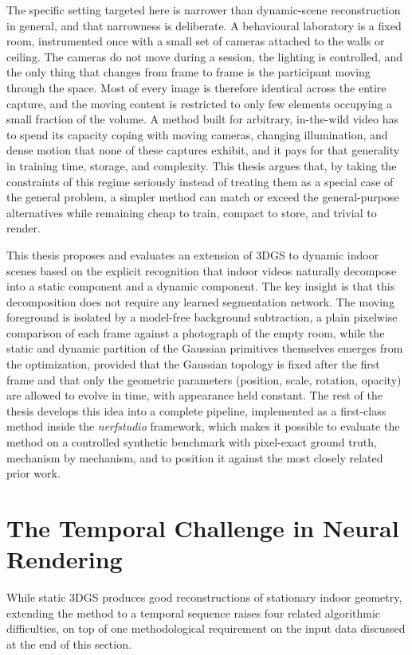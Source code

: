 The specific setting targeted here is narrower than dynamic-scene reconstruction
in general, and that narrowness is deliberate. A behavioural laboratory is a
fixed room, instrumented once with a small set of cameras attached to the walls
or ceiling. The cameras do not move during a session, the lighting is
controlled, and the only thing that changes from frame to frame is the
participant moving through the space. Most of every image is therefore identical
across the entire capture, and the moving content is restricted to only few
elements occupying a small fraction of the volume. A method built for arbitrary,
in-the-wild video has to spend its capacity coping with moving cameras, changing
illumination, and dense motion that none of these captures exhibit, and it pays
for that generality in training time, storage, and complexity. This thesis
argues that, by taking the constraints of this regime seriously instead of
treating them as a special case of the general problem, a simpler method can
match or exceed the general-purpose alternatives while remaining cheap to train,
compact to store, and trivial to render.

This thesis proposes and evaluates an extension of 3DGS to dynamic indoor scenes
based on the explicit recognition that indoor videos naturally decompose into a
static component and a dynamic component. The key insight is that
this decomposition does not require any learned segmentation network. The moving
foreground is isolated by a model-free background subtraction, a plain pixelwise
comparison of each frame against a photograph of the empty room, while the
static and dynamic partition of the Gaussian primitives themselves emerges from
the optimization, provided that the Gaussian topology is fixed after the first
frame and that only the geometric parameters (position, scale, rotation,
opacity) are allowed to evolve in time, with appearance held constant. The rest
of the thesis develops this idea into a complete pipeline, implemented as a
first-class method inside the \emph{nerfstudio} framework, which makes it
possible to evaluate the method on a controlled synthetic benchmark with
pixel-exact ground truth, mechanism by mechanism, and to position it against the
most closely related prior work.

\section{The Temporal Challenge in Neural Rendering}

While static 3DGS produces good reconstructions of stationary indoor geometry,
extending the method to a temporal sequence raises four related algorithmic
difficulties, on top of one methodological requirement on the input data
discussed at the end of this section.

